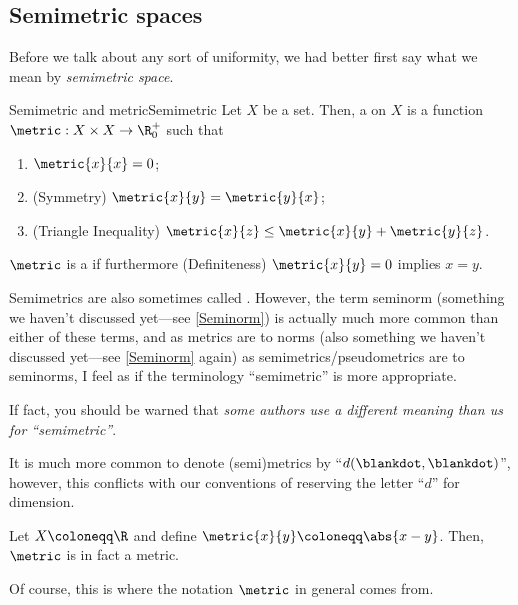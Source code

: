 \subsection{Semimetric spaces}

Before we talk about any sort of uniformity, we had better first say what we mean by \emph{semimetric space}.
\begin{dfn}{Semimetric and metric}{Semimetric}
Let $X$ be a set.  Then, a  on $X$ is a function $\metric:X\times X\rightarrow \R _0^+$ such that
\begin{enumerate}
\item $\metric{x}{x}=0$;
\item (Symmetry) $\metric{x}{y}=\metric{y}{x}$;
\item (Triangle Inequality) $\metric{x}{z}\leq \metric{x}{y}+\metric{y}{z}$.
\end{enumerate}
$\metric$ is a  if furthermore (Definiteness) $\metric{x}{y}=0$ implies $x=y$.
\begin{rmk}
Semimetrics are also sometimes called .  However, the term seminorm (something we haven't discussed yet---see \cref{Seminorm}) is actually much more common than either of these terms, and as metrics are to norms (also something we haven't discussed yet---see \cref{Seminorm} again) as semimetrics/pseudometrics are to seminorms, I feel as if the terminology ``semimetric'' is more appropriate.

If fact, you should be warned that \emph{some authors use a different meaning than us for ``semimetric''}.
\end{rmk}
\begin{rmk}
It is much more common to denote (semi)metrics by ``$d(\blankdot ,\blankdot )$'', however, this conflicts with our conventions of reserving the letter ``$d$'' for dimension.
\end{rmk}
\end{dfn}
\begin{exm}{}{}
Let $X\coloneqq \R$ and define $\metric{x}{y}\coloneqq \abs{x-y}$.  Then, $\metric$ is in fact a metric.
\begin{rmk}
Of course, this is where the notation $\metric$ in general comes from.
\end{rmk}
\end{exm}
